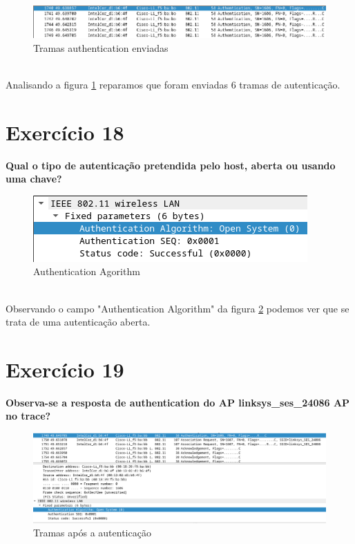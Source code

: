 \documentclass[a4paper]{report}
\begin{document}
\begin{figure}[H]
    \centering 
    \includegraphics[width=\textwidth]{images/authenticationEx17.png}  
    \caption{Tramas authentication enviadas}
    \label{fig:authenticationEx17}
\end{figure}\\

Analisando a figura \ref{fig:authenticationEx17} reparamos que foram enviadas
6 tramas de autenticação.


\section{Exercício 18}
\textbf{Qual o tipo de autenticação pretendida pelo host, aberta ou usando uma
    chave?}\\

\begin{figure}[H]
    \centering 
    \includegraphics[width=\textwidth]{images/authenticationEx18.png}  
    \caption{Authentication Agorithm}
    \label{fig:authenticationEx18}
\end{figure}\\

Observando o campo "Authentication Algorithm" da figura \ref{fig:authenticationEx18}
podemos ver que se trata de uma autenticação aberta.

\section{Exercício 19}
\textbf{Observa-se a resposta de authentication do AP linksys\_ses\_24086 AP no
    trace?}\\

\begin{figure}[H]
    \centering 
    \includegraphics[width=\textwidth]{images/tramasEx19.png}  
    \caption{Tramas após a autenticação}
    \label{fig:tramasEx19}
\end{figure}\\
\end{document}
